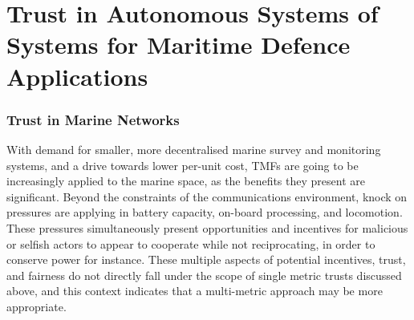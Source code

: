 

\chapter{Trust in Autonomous Systems of Systems for Maritime Defence Applications} 
\label{Chapter\thechapter}

\subsection{Trust in Marine Networks}\label{sec:trust_in_marine}

With demand for smaller, more decentralised marine survey and monitoring systems, and a drive towards lower per-unit cost, TMFs are going to be increasingly applied to the marine space, as the benefits they present are significant.
Beyond the constraints of the communications environment, knock on pressures are applying in battery capacity, on-board processing, and locomotion.
These pressures simultaneously present opportunities and incentives for malicious or selfish actors to appear to cooperate while not reciprocating, in order to conserve power for instance.
These multiple aspects of potential incentives, trust, and fairness do not directly fall under the scope of single metric trusts discussed above, and this context indicates that a multi-metric approach may be more appropriate.


